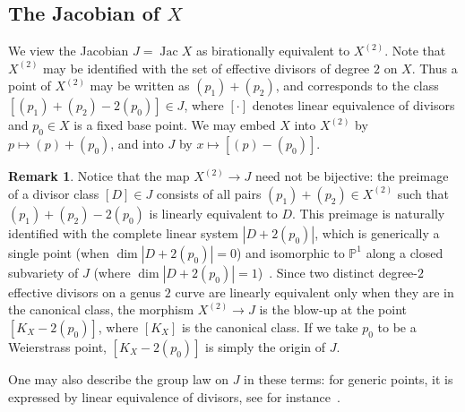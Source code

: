 \documentclass[a4paper,twoside,english]{amsart}
\theoremstyle{plain}
\theoremstyle{definition}
\newtheorem{remark}[theorem]{Remark}
\begin{document}
\subsection{The Jacobian of \texorpdfstring{$X$}{X}}
We view the Jacobian $J= \operatorname{Jac} X$ as birationally equivalent to $X^{(2)}$. Note that $X^{(2)}$ may be identified with the set of effective divisors of degree $2$ on $X$. Thus a point of $X^{(2)}$ may be written as
$(p_1)+(p_2)$, and corresponds to the class
$[(p_1)+(p_2)-2(p_0)]\in J$,
where $[\cdot]$ denotes linear equivalence of divisors and $p_0\in X$ is a fixed base point.
We may embed $X$ into $X^{(2)}$ by $p \longmapsto (p)+(p_0)$, and into $J$ by $x\longmapsto [(p)-(p_0)]$.


\begin{remark}
\label{remark: blow down}
    Notice that the map $X^{(2)} \to J$ need not be bijective: the preimage of a divisor class $[D] \in J$ consists of all pairs $(p_1) + (p_2) \in X^{(2)}$ such that $(p_1) + (p_2) - 2(p_0)$ is linearly equivalent to $D$. This preimage is naturally identified with the complete linear system $|D+2(p_0)|$, which is generically a single point (when $\dim |D+2(p_0)| = 0$) and isomorphic to $\mathbb{P}^1$ along a closed subvariety of $J$ (where $\dim |D+2(p_0)| = 1$)~\cite[\S 5]{MR861976}.
    Since two distinct degree-$2$ effective divisors on a genus $2$ curve are linearly equivalent only when they are in the canonical class, the morphism $X^{(2)} \to J$ is the blow-up at the point $[K_X-2(p_0)]$, where $[K_X]$ is the canonical class. If we take $p_0$ to be a Weierstrass point, $[K_X - 2(p_0)]$ is simply the origin of $J$.
\end{remark}


One may also describe the group law on $J$ in these terms: for generic points, it is expressed by linear equivalence of divisors, see for instance~\cite{Serre1988}.

 
\end{document}
